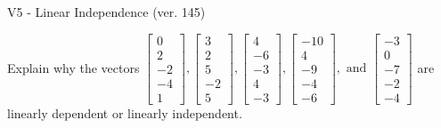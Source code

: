 \begin{exercise}
  \begin{exerciseTitle}V5 - Linear Independence (ver. 145)\end{exerciseTitle}
  \begin{exerciseStatement}
    Explain why the vectors \(\left[\begin{array}{r}
0 \\
2 \\
-2 \\
-4 \\
1
\end{array}\right] , \left[\begin{array}{r}
3 \\
2 \\
5 \\
-2 \\
5
\end{array}\right] , \left[\begin{array}{r}
4 \\
-6 \\
-3 \\
4 \\
-3
\end{array}\right] , \left[\begin{array}{r}
-10 \\
4 \\
-9 \\
-4 \\
-6
\end{array}\right] , \text{ and } \left[\begin{array}{r}
-3 \\
0 \\
-7 \\
-2 \\
-4
\end{array}\right]\) are linearly dependent or linearly independent.	



\end{exerciseStatement}
\end{exercise}
